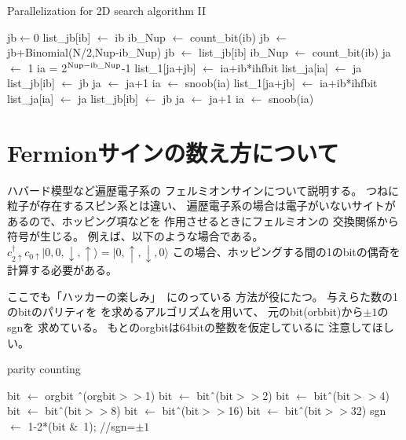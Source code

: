 \documentclass[prb,aps,showpacs,preprint,nofootinbib]{revtex4}
\newcommand{\lef}{\leftarrow}
\newcommand{\up}{\uparrow}
\newcommand{\down}{\downarrow}
\begin{document}
\begin{algorithm}                      
\caption{Parallelization for 2D search algorithm II}         
\label{alg:PHack}                          
\begin{algorithmic}                  
\STATE jb$\lef 0$
  \STATE list\_jb[ib] $\lef$ ib
  \STATE ib\_Nup $\lef$ count\_bit(ib)
  \STATE jb $\lef$ jb+Binomial(N/2,Nup-ib\_Nup)
\ENDFOR
{}
  \STATE jb $\lef$ list\_jb[ib]
  \STATE ib\_Nup $\lef$ count\_bit(ib)
  \STATE ja $\lef$ 1 
      \STATE ia = 2$^{\rm Nup-ib\_Nup}$-1
        \STATE list\_1[ja+jb] $\lef$ ia+ib*ihfbit
        \STATE list\_ja[ia] $\lef$ ja
        \STATE list\_jb[ib] $\lef$ jb
        \STATE ja $\lef$ ja+1
          \STATE ia $\lef$ snoob(ia)
             \STATE list\_1[ja+jb] $\lef$ ia+ib*ihfbit
             \STATE list\_ja[ia] $\lef$ ja
             \STATE list\_jb[ib] $\lef$ jb
             \STATE ja $\lef$ ja+1
             \STATE ia $\lef$ snoob(ia)
          \ENDWHILE
        \ENDIF
      \ENDIF
    \ENDIF
\ENDFOR
\end{algorithmic}
\end{algorithm}

\newpage

\section{Fermionサインの数え方について}
ハバード模型など遍歴電子系の
フェルミオンサインについて説明する。
つねに粒子が存在するスピン系とは違い、
遍歴電子系の場合は電子がいないサイトが
あるので、ホッピング項などを
作用させるときにフェルミオンの
交換関係から符号が生じる。
例えば、以下のような場合である。
$c^{\dagger}_{2\up}c_{0\up}|0,0,\down,\up\rangle=|0,\up,\down,0\rangle$
この場合、ホッピングする間の1のbitの偶奇を
計算する必要がある。

ここでも「ハッカーの楽しみ」~\cite{hacker,hacker_jp}にのっている
方法が役にたつ。
与えらた数の1のbitのパリティを
を求めるアルゴリズムを用いて、
元のbit(orbbit)から$\pm1$のsgnを
求めている。
もとのorgbitは64bitの整数を仮定しているに
注意してほしい。

\begin{algorithm}                      
\caption{parity counting}         
\begin{algorithmic}                  
\STATE   bit  $\lef$   orgbit \^\ (orgbit$>>$1)
\STATE   bit  $\lef$   bit\^\ (bit$>>$2)
\STATE   bit  $\lef$   bit\^\ (bit$>>$4)
\STATE   bit  $\lef$   bit\^\ (bit$>>$8)
\STATE   bit  $\lef$   bit\^\ (bit$>>$16)
\STATE   bit  $\lef$   bit\^\ (bit$>>$32)
\STATE   sgn  $\lef$   1-2*(bit \&\ 1); //sgn=$\pm 1$
\end{algorithmic}
\label{alg:parity}                          
\end{algorithm}



\end{document}
